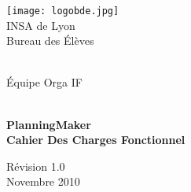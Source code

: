 \begin{titlepage}



\begin{minipage}{0.3\textwidth}
\centering
\texttt{[image: logobde.jpg]}
\\
INSA de Lyon \\
Bureau des Élèves \\

\end{minipage}
\hfill
\begin{minipage}{0.3\textwidth}
\centering
 
~
\\[3cm]

Équipe Orga IF
\end{minipage}


\begin{center} 
\hrulefill \\[0.4cm]
{ \Huge \bfseries PlanningMaker}\\ {  \bfseries Cahier Des Charges Fonctionnel} \\[0.4cm]
 \hrulefill






\vfill {\Large Révision 1.0} \\[2cm]
{ Novembre 2010  } \\





\end{center}


\end{titlepage}

